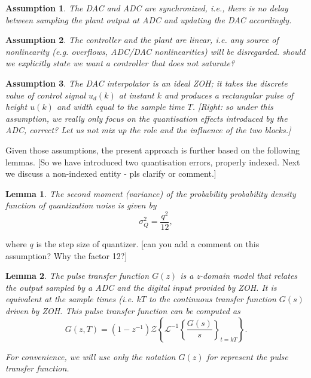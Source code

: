 \documentclass{sig-alternate-05-2015}
\newcommand{\blue}[1]{{\color{blue}#1}}
\newcommand{\red}[1]{{\color{red}#1}}
\newcommand{\green}[1]{{\color{green}#1}}
\newtheorem{myassumption}{Assumption}
\newtheorem{mylemma}{Lemma}
\begin{document}
\begin{myassumption}
%
The DAC and ADC are synchronized, {\it i.e.}, there is no delay between
sampling the plant output at ADC and updating the DAC accordingly.
%
\end{myassumption}

\begin{myassumption}
%
The controller and the plant are linear, {\it i.e.} any source of nonlinearity ({\it e.g.} overflows, ADC/DAC nonlinearities) will be disregarded.
\red{should we explicitly state we want a controller that does not saturate?}
%
\end{myassumption}

\begin{myassumption}
%
The DAC interpolator is an ideal ZOH; it takes the discrete value of control
signal $u_d(k)$ at instant $k$ and produces a rectangular pulse of height
$u(k)$ and width equal to the sample time $T$. \red{[Right: so under this assumption, we really only focus on the quantisation effects introduced by the ADC, correct? Let us not mix up the role and the influence of the two blocks.]}
%
\end{myassumption}

Given those assumptions, the present approach is further based on the following lemmas. 
\red{[So we have introduced two quantisation errors, properly indexed. Next we discuss a non-indexed entity - pls clarify or comment.]}
%
\begin{mylemma}
%
\cite{widrow1956} The second moment (variance) of the probability probability density function of quantization
noise is given by %
%
\begin{equation}
\label{eq:variancelemma}
\sigma_{Q}^{2}=\frac{q^{2}}{12},
\end{equation}
\end{mylemma}
where $q$ is the step size of quantizer. \blue{[can you add a comment on this assumption? Why the factor 12?]}

\begin{mylemma} \cite{astrom1997computer}
%
The pulse transfer function $G(z)$ is a z-domain model that relates the output sampled by a ADC and the digital input provided by ZOH. It is equivalent at the sample times ({\it i.e.} $kT$ to the continuous transfer function $G(s)$ driven by ZOH.  This pulse transfer
function can be computed as
%
\begin{equation}
\label{eq:pulsetf}
G(z,T) = (1-z^{-1})\mathcal{Z}\left\lbrace{\mathcal{L}^{-1}\left\lbrace{\frac{G(s)}{s}}\right\rbrace_{t=kT}}\right\rbrace.
\end{equation}

For convenience, we will use only the notation $G(z)$ for represent the pulse transfer function.
\end{mylemma}
\end{document}
